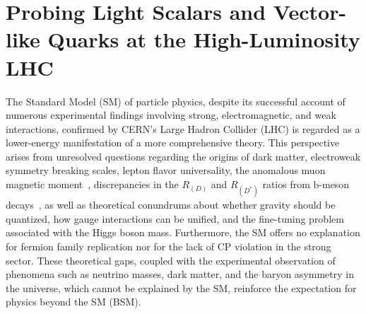 \chapter{Probing Light Scalars and Vector-like Quarks at the High-Luminosity LHC}



The Standard Model (SM) of particle physics, despite its successful account of numerous experimental findings involving strong, electromagnetic, and weak interactions, confirmed by CERN's Large Hadron Collider (LHC) is regarded as a lower-energy manifestation of a more comprehensive theory. This perspective arises from unresolved questions regarding the origins of dark matter, electroweak symmetry breaking scales, lepton flavor universality, the anomalous muon magnetic moment~\parencite{PhysRevD.73.072003, g2cit,Davier2017,Davier2020,PhysRevLett.121.022003,PhysRevD.97.114025,PhysRevLett.124.132002,PhysRevD.100.076004}, discrepancies in the $R_{(D)}$ and $R_{(D^{*})}$ ratios from $\mathrm{b}$-meson decays~\parencite{ BaBar:2012obs,BaBar:2013mob, Huschle:2015rga,LHCb:2015gmp,Aaij:2015yra,Sato:2016svk, Hirose:2016wfn, Aaij:2017uff, Hirose:2017dxl,LHCb:2017rln,Abdesselam:2019dgh,Belle:2019rba,LHCb:2023zxo}, as well as theoretical conundrums about whether gravity should be quantized, how gauge interactions can be unified, and the fine-tuning problem associated with the Higgs boson mass. Furthermore, the SM offers no explanation for fermion family replication nor for the lack of CP violation in the strong sector. These theoretical gaps, coupled with the experimental observation of phenomena such as neutrino masses, dark matter, and the baryon asymmetry in the universe, which cannot be explained by the SM, reinforce the expectation for physics beyond the SM (BSM).

